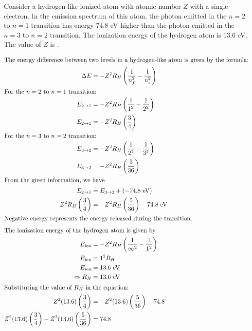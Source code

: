 
\item Consider a hydrogen-like ionized atom with atomic number \( Z \) with a single electron. In the emission spectrum of this atom, the photon emitted in the \( n = 2 \) to \( n = 1 \) transition has energy \( 74.8 \) eV higher than the photon emitted in the \( n = 3 \) to \( n = 2 \) transition. The ionization energy of the hydrogen atom is \( 13.6 \) eV. The value of \( Z \) is \underline{\hspace{2cm}}.

    \begin{solution}
        \begin{align*}
            \intertext{The energy difference between two levels in a hydrogen-like atom is given by the formula:}
            \Delta E &= -Z^2R_H\left(\frac{1}{n_f^2}-\frac{1}{n_i^2}\right)\\
            \intertext{For the \(n=2\) to \(n=1\) transition:}
            E_{2\rightarrow 1} &= -Z^2R_H\left(\frac{1}{1^2}-\frac{1}{2^2}\right)\\
            E_{2\rightarrow 1} &= -Z^2R_H\left(\frac{3}{4}\right)\\
            \intertext{For the \(n=3\) to \(n=2\) transition:}
            E_{3\rightarrow 2} &= -Z^2R_H\left(\frac{1}{2^2}-\frac{1}{3^2}\right)\\
            E_{3\rightarrow 2} &= -Z^2R_H\left(\frac{5}{36}\right)\\
            \intertext{From the given information, we have}
            E_{2\rightarrow 1} &= E_{3\rightarrow 2} + (-74.8\text{ eV})\\
            -Z^2R_H\left(\frac{3}{4}\right) &= -Z^2R_H\left(\frac{5}{36}\right) - 74.8\text{ eV}\\
            \intertext{Negative energy represents the energy released during the transition.}
            \intertext{The ionization energy of the hydrogen atom is given by}
            E_{\text{ion}} &= -Z^2R_H\left(\frac{1}{\infty^2}-\frac{1}{1^2}\right)\\
            E_{\text{ion}} &= 1^2R_H\\
            E_{\text{ion}} &= 13.6\text{ eV}\\
            \Rightarrow R_H &= 13.6\text{ eV}\\
            \intertext{Substituting the value of \( R_H \) in the equation:}
            -Z^2(13.6)\left(\frac{3}{4}\right) &= -Z^2(13.6)\left(\frac{5}{36}\right) - 74.8\\
            Z^2(13.6)\left(\frac{3}{4}\right) - Z^2(13.6)\left(\frac{5}{36}\right) &= 74.8\\

\end{align*}
\end{solution}
